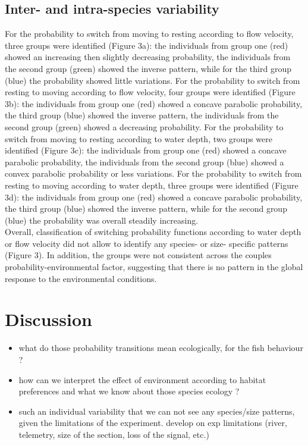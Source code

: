 \documentclass[
  letterpaper,
  DIV=11,
  numbers=noendperiod]{scrartcl}
\begin{document}
\hypertarget{inter--and-intra-species-variability}{%
\subsection{Inter- and intra-species
variability}\label{inter--and-intra-species-variability}}

For the probability to switch from moving to resting according to flow
velocity, three groups were identified (Figure 3a): the individuals from
group one (red) showed an increasing then slightly decreasing
probability, the individuals from the second group (green) showed the
inverse pattern, while for the third group (blue) the probability showed
little variations. For the probability to switch from resting to moving
according to flow velocity, four groups were identified (Figure 3b): the
individuals from group one (red) showed a concave parabolic probability,
the third group (blue) showed the inverse pattern, the individuals from
the second group (green) showed a decreasing probability. For the
probability to switch from moving to resting according to water depth,
two groups were identified (Figure 3c): the individuals from group one
(red) showed a concave parabolic probability, the individuals from the
second group (blue) showed a convex parabolic probability or less
variations. For the probability to switch from resting to moving
according to water depth, three groups were identified (Figure 3d): the
individuals from group one (red) showed a concave parabolic probability,
the third group (blue) showed the inverse pattern, while for the second
group (blue) the probability was overall steadily increasing.\\
Overall, classification of switching probability functions according to
water depth or flow velocity did not allow to identify any species- or
size- specific patterns (Figure 3). In addition, the groups were not
consistent across the couples probability-environmental factor,
suggesting that there is no pattern in the global response to the
environmental conditions.

\hypertarget{discussion}{%
\section{Discussion}\label{discussion}}

\begin{itemize}
\item
  what do those probability transitions mean ecologically, for the fish
  behaviour ?
\item
  how can we interpret the effect of environment according to habitat
  preferences and what we know about those species ecology ?
\item
  such an individual variability that we can not see any species/size
  patterns, given the limitations of the experiment. develop on exp
  limitations (river, telemetry, size of the section, loss of the
  signal, etc.)
\end{itemize}
\end{document}
